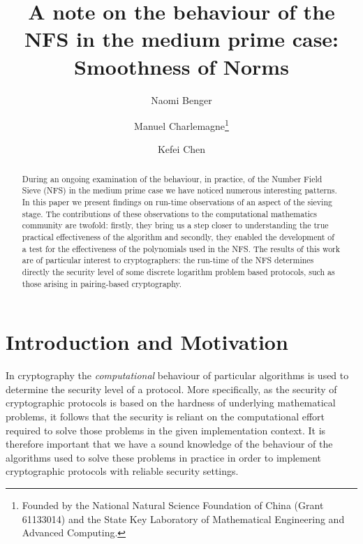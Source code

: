 \documentclass[a4paper, 12pt, envcountsect, runningheads]{llncs}
\numberwithin{figure}{section}
\numberwithin{equation}{section}
\begin{document}
\title{A note on the behaviour of the NFS in the medium prime case: Smoothness of Norms}

\author{Naomi Benger
\and Manuel Charlemagne\thanks{Founded by the National Natural Science Foundation of China (Grant 61133014) and the State Key Laboratory of Mathematical Engineering and Advanced Computing.}
\and Kefei Chen}

\maketitle
\begin{abstract}
During an ongoing examination of the behaviour, in practice, of the Number Field Sieve (NFS) in the medium prime case we have noticed numerous interesting patterns. In this paper we present findings on run-time observations of an aspect of the sieving stage. The contributions of these observations to the computational mathematics community are twofold: firstly, they bring us a step closer to understanding the true practical effectiveness of the algorithm and secondly, they enabled the development of a test for the effectiveness of the polynomials used in the NFS. The results of this work are of particular interest to cryptographers: the run-time of the NFS determines directly the security level of some discrete logarithm problem based protocols, such as those arising in pairing-based cryptography.
\end{abstract}
\section{Introduction and Motivation}
In cryptography the {\em computational} behaviour of particular algorithms is used to determine the security level of a protocol. More specifically, as the security of cryptographic protocols is based on the hardness of underlying mathematical problems, it follows that the security is reliant on the computational effort required to solve those problems in the given implementation context. It is therefore important that we have a sound knowledge of the behaviour of the algorithms used to solve these problems in practice in order to implement cryptographic protocols with reliable security settings.
\end{document}
